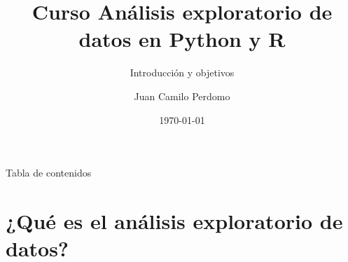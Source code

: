 %

\usepackage [spanish]{babel}
\usepackage [utf 8]{inputenc}

\title[Curso Análisis exploratorio de datos en Python y R]{\huge\textbf{Curso Análisis exploratorio de datos en Python y R}}
\subtitle{Introducción y objetivos}
\author{Juan Camilo Perdomo}
\date{\today}




\begin{frame}{}
    \maketitle
\end{frame}

\begin{frame}{Tabla de contenidos}
    \tableofcontents
\end{frame}

\section{¿Qué es el análisis exploratorio de datos?}


